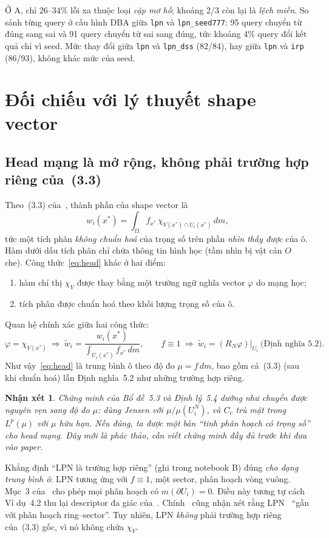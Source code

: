 \documentclass[11pt,a4paper]{article}
\newtheorem*{nhanxet}{Nhận xét}
\newcommand{\run}[1]{\texttt{#1}}
\newcommand{\dd}{\,dm}
\begin{document}
Ở A, chỉ 26--34\% lỗi xa thuộc loại \emph{cặp mơ hồ}; khoảng 2/3 còn lại là \emph{lệch miền}. So sánh từng query ở cấu hình DBA giữa \run{lpn} và \run{lpn\_seed777}: 95 query chuyển từ đúng sang sai và 91 query chuyển từ sai sang đúng, tức khoảng 4\% query đổi kết quả chỉ vì seed. Mức thay đổi giữa \run{lpn} và \run{lpn\_dss} (82/84), hay giữa \run{lpn} và \run{irp} (86/93), không khác mức của seed.

\section{Đối chiếu với lý thuyết shape vector~\cite{huu2026}}\label{sec:doichieu}
\subsection{Head mạng là mở rộng, không phải trường hợp riêng của~(3.3)}
Theo~(3.3) của~\cite{huu2026}, thành phần của shape vector là
\[
w_i(x^*)=\int_\Omega f_{x^*}\,\chi_{V(x^*)\cap U_i(x^*)}\dd ,
\]
tức một tích phân \emph{không chuẩn hoá} của trọng số trên phần \emph{nhìn thấy được} của ô. Hàm dưới dấu tích phân chỉ chứa thông tin hình học (tầm nhìn bị vật cản $O$ che). Công thức~\eqref{eq:head} khác ở hai điểm:
\begin{enumerate}[label=(\alph*)]
\item hàm chỉ thị $\chi_{V}$ được thay bằng một trường ngữ nghĩa vector $\varphi$ do mạng học;
\item tích phân được chuẩn hoá theo khối lượng trọng số của ô.
\end{enumerate}
Quan hệ chính xác giữa hai công thức:
\[
\varphi=\chi_{V(x^*)}\ \Longrightarrow\ \tilde w_i=\frac{w_i(x^*)}{\int_{U_i(x^*)} f_{x^*}\dd},\qquad
f\equiv1\ \Longrightarrow\ \tilde w_i=(R_N\varphi)\big|_{U_i}\ \text{(Định nghĩa 5.2)}.
\]
Như vậy~\eqref{eq:head} là trung bình ô theo độ đo $\mu=f\,dm$, bao gồm cả~(3.3) (sau khi chuẩn hoá) lẫn Định nghĩa~5.2 như những trường hợp riêng.

\begin{nhanxet}
Chứng minh của Bổ đề~5.3 và Định lý~5.4 dường như chuyển được nguyên vẹn sang độ đo $\mu$: dùng Jensen với $\mu/\mu(U_i^N)$, và $C_c$ trù mật trong $L^p(\mu)$ với $\mu$ hữu hạn. Nếu đúng, ta được một bản ``tinh phân hoạch có trọng số'' cho head mạng. Đây mới là phác thảo, cần viết chứng minh đầy đủ trước khi đưa vào paper.
\end{nhanxet}

Khẳng định ``LPN là trường hợp riêng'' (ghi trong notebook B) đúng \emph{cho dạng trung bình ô}: LPN tương ứng với $f\equiv1$, một sector, phân hoạch vòng vuông. Mục~3 của~\cite{huu2026} cho phép mọi phân hoạch có $m(\partial U_i)=0$. Điều này tương tự cách Ví dụ~4.2 thu lại descriptor đa giác của~\cite{ouyang2024}. Chính~\cite{huu2026} cũng nhận xét rằng LPN~\cite{lpn} ``gần với phân hoạch ring--sector''. Tuy nhiên, LPN \emph{không} phải trường hợp riêng của~(3.3) gốc, vì nó không chứa $\chi_V$.
\end{document}
